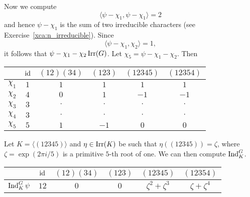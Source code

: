 Now we compute 
\[
\langle \psi-\chi_1,\psi-\chi_1\rangle=2
\]
and hence $\psi-\chi_1$ is the sum of two irreducible
characters (see Exercise~\ref{xca:n_irreducible}). Since
\[
\langle \psi-\chi_1,\chi_2\rangle=1,
\]
it follows that $\psi-\chi_1-\chi_2\operatorname{Irr}(G)$. Let 
$\chi_5=\psi-\chi_1-\chi_2$. Then

\bigskip 
\begin{center}
        \begin{tabular}{|c|ccccc|}
        \hline  
         & $\operatorname{id}$ & $(12)(34)$ & $(123)$ & $(12345)$ & $(12354)$\\
        \hline 
        $\chi_1$ & $1$ & $1$ & $1$ & $1$ & $1$\\
        $\chi_2$ & $4$ & $0$ & $1$ & $-1$ & $-1$\\
        $\chi_3$ & $3$ & $\cdot$ & $\cdot$ & $\cdot$& $\cdot$\\
        $\chi_4$ & $3$ & $\cdot$ & $\cdot$ & $\cdot$& $\cdot$\\
        $\chi_5$ & $5$ & $1$ & $-1$ & $0$& $0$\\
        \hline 
    \end{tabular}
\end{center}
\bigskip 

Let $K=\langle(12345)\rangle$ and 
$\eta\in\operatorname{Irr}(K)$ be such that $\eta((12345))=\zeta$, where
$\zeta=\exp(2\pi i/5)$ is a primitive $5$-th root of one. We can then compute 
$\operatorname{Ind}_K^G$. 

\bigskip 
\begin{center}
        \begin{tabular}{|c|ccccc|}
        \hline  
         & $\operatorname{id}$ & $(12)(34)$ & $(123)$ & $(12345)$ & $(12354)$\\
         \hline 
         $\operatorname{Ind}_K^G\psi$ & $12$ & $0$ & $0$ & $\zeta^2+\zeta^3$ & $\zeta+\zeta^4$\\
         \hline 
\end{tabular}
\end{center}
\bigskip 

